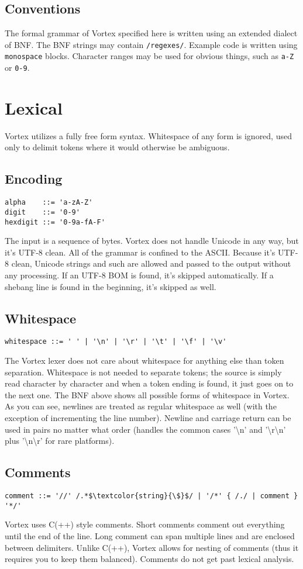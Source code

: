 \documentclass{article}
\begin{document}
\subsection{Conventions}
The formal grammar of Vortex specified here is written using an extended
dialect of BNF. The BNF strings may contain \verb|/regexes/|. Example code is
written using \verb|monospace| blocks. Character ranges may be used for obvious
things, such as \verb|a-Z| or \verb|0-9|.

\section{Lexical}
Vortex utilizes a fully free form syntax. Whitespace of any form is ignored,
used only to delimit tokens where it would otherwise be ambiguous.
\subsection{Encoding}
\begin{lstlisting}[language=bnf]
alpha    ::= 'a-zA-Z'
digit    ::= '0-9'
hexdigit ::= '0-9a-fA-F'
\end{lstlisting}
The input is a sequence of bytes. Vortex does not handle Unicode in any way,
but it's UTF-8 clean. All of the grammar is confined to the ASCII. Because
it's UTF-8 clean, Unicode strings and such are allowed and passed to the
output without any processing. If an UTF-8 BOM is found, it's skipped
automatically. If a shebang line is found in the beginning, it's skipped
as well.
\subsection{Whitespace}
\begin{lstlisting}[language=bnf]
whitespace ::= ' ' | '\n' | '\r' | '\t' | '\f' | '\v'
\end{lstlisting}
The Vortex lexer does not care about whitespace for anything else than token
separation. Whitespace is not needed to separate tokens; the source is simply
read character by character and when a token ending is found, it just goes on
to the next one. The BNF above shows all possible forms of whitespace in
Vortex. As you can see, newlines are treated as regular whitespace as well
(with the exception of incrementing the line number). Newline and carriage
return can be used in pairs no matter what order (handles the common cases
'\textbackslash n' and '\textbackslash r\textbackslash n' plus
'\textbackslash n\textbackslash r' for rare platforms).
\subsection{Comments}
\begin{lstlisting}[language=bnf,mathescape]
comment ::= '//' /.*$\textcolor{string}{\$}$/ | '/*' { /./ | comment } '*/'
\end{lstlisting}
Vortex uses C(++) style comments. Short comments comment out everything until
the end of the line. Long comment can span multiple lines and are enclosed
between delimiters. Unlike C(++), Vortex allows for nesting of comments
(thus it requires you to keep them balanced). Comments do not get past
lexical analysis.
\end{document}
